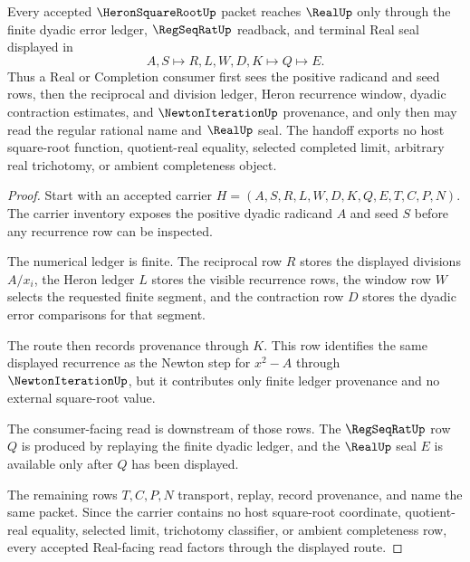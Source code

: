 \begin{theorem}
\label{thm:heron-square-root-regular-cauchy-handoff}
Every accepted $\HeronSquareRootUp$ packet reaches $\RealUp$ only through the finite dyadic error ledger, $\RegSeqRatUp$ readback, and terminal Real seal displayed in
$$
A,S \longmapsto R,L,W,D,K \longmapsto Q \longmapsto E .
$$
Thus a Real or Completion consumer first sees the positive radicand and seed rows, then the reciprocal and division ledger, Heron recurrence window, dyadic contraction estimates, and $\NewtonIterationUp$ provenance, and only then may read the regular rational name and $\RealUp$ seal. The handoff exports no host square-root function, quotient-real equality, selected completed limit, arbitrary real trichotomy, or ambient completeness object.
\end{theorem}
\begin{proof}
Start with an accepted carrier $H=(A,S,R,L,W,D,K,Q,E,T,C,P,N)$. The carrier inventory exposes the positive dyadic radicand $A$ and seed $S$ before any recurrence row can be inspected.

The numerical ledger is finite. The reciprocal row $R$ stores the displayed divisions $A/x_i$, the Heron ledger $L$ stores the visible recurrence rows, the window row $W$ selects the requested finite segment, and the contraction row $D$ stores the dyadic error comparisons for that segment.

The route then records provenance through $K$. This row identifies the same displayed recurrence as the Newton step for $x^2-A$ through $\NewtonIterationUp$, but it contributes only finite ledger provenance and no external square-root value.

The consumer-facing read is downstream of those rows. The $\RegSeqRatUp$ row $Q$ is produced by replaying the finite dyadic ledger, and the $\RealUp$ seal $E$ is available only after $Q$ has been displayed.

The remaining rows $T,C,P,N$ transport, replay, record provenance, and name the same packet. Since the carrier contains no host square-root coordinate, quotient-real equality, selected limit, trichotomy classifier, or ambient completeness row, every accepted Real-facing read factors through the displayed route.
\end{proof}

